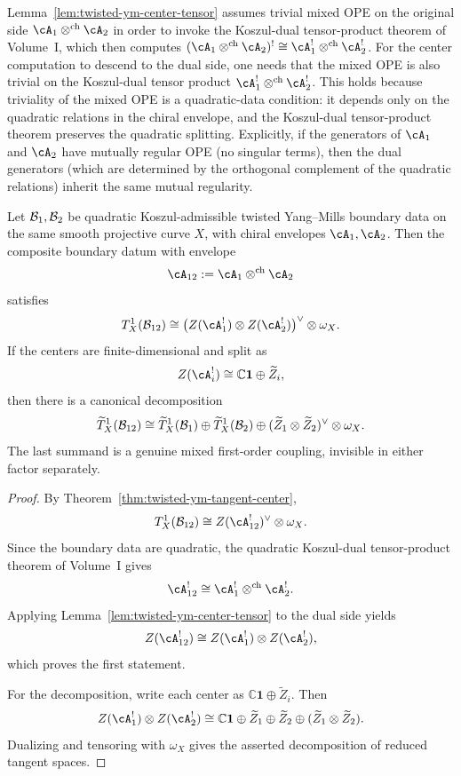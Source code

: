 \begin{remark}
\label{rem:mixed-ope-dual-side}
Lemma~\ref{lem:twisted-ym-center-tensor} assumes trivial mixed OPE on the original side $\cA_1\otimes^{\mathrm{ch}}\cA_2$ in order to invoke the Koszul-dual tensor-product theorem of Volume~I, which then computes $(\cA_1\otimes^{\mathrm{ch}}\cA_2)^! \cong \cA_1^!\otimes^{\mathrm{ch}}\cA_2^!$. For the center computation to descend to the dual side, one needs that the mixed OPE is also trivial on the Koszul-dual tensor product $\cA_1^!\otimes^{\mathrm{ch}}\cA_2^!$. This holds because triviality of the mixed OPE is a quadratic-data condition: it depends only on the quadratic relations in the chiral envelope, and the Koszul-dual tensor-product theorem preserves the quadratic splitting. Explicitly, if the generators of $\cA_1$ and $\cA_2$ have mutually regular OPE (no singular terms), then the dual generators (which are determined by the orthogonal complement of the quadratic relations) inherit the same mutual regularity.
\end{remark}

\begin{theorem}
\label{thm:twisted-ym-binary-mixed-couplings}
Let $\mathcal{B}_1,\mathcal{B}_2$ be quadratic Koszul-admissible twisted Yang--Mills boundary data on the same smooth projective curve $X$, with chiral envelopes $\cA_1,\cA_2$. Then the composite boundary datum with envelope
\[
\cA_{12}:=\cA_1\otimes^{\mathrm{ch}}\cA_2
\]
satisfies
\[
T^1_X(\cB_{12})
\cong
\bigl(Z(\cA_1^{!})\otimes Z(\cA_2^{!})\bigr)^{\vee}\otimes \omega_X.
\]
If the centers are finite-dimensional and split as
\[
Z(\cA_i^{!}) \cong \mathbb{C}\mathbf{1}\oplus \widetilde Z_i,
\]
then there is a canonical decomposition
\[
\widetilde T^1_X(\mathcal{B}_{12})
\cong
\widetilde T^1_X(\mathcal{B}_1)
\oplus
\widetilde T^1_X(\mathcal{B}_2)
\oplus
(\widetilde Z_1\otimes \widetilde Z_2)^{\vee}\otimes \omega_X.
\]
The last summand is a genuine mixed first-order coupling, invisible in either factor separately.
\end{theorem}

\begin{proof}
By Theorem~\ref{thm:twisted-ym-tangent-center},
\[
T^1_X(\cB_{12})
\cong
Z(\cA_{12}^{!})^{\vee}\otimes \omega_X.
\]
Since the boundary data are quadratic, the quadratic Koszul-dual
tensor-product theorem of Volume~I gives
\[
\cA_{12}^{!}
\cong
\cA_1^{!}\otimes^{\mathrm{ch}}\cA_2^{!}.
\]
Applying Lemma~\ref{lem:twisted-ym-center-tensor} to the dual side yields
\[
Z(\cA_{12}^{!})
\cong
Z(\cA_1^{!})\otimes Z(\cA_2^{!}),
\]
which proves the first statement.

For the decomposition, write each center as $\mathbb{C}\mathbf{1}\oplus \widetilde Z_i$. Then
\[
Z(\cA_1^{!})\otimes Z(\cA_2^{!})
\cong
\mathbb{C}\mathbf{1}
\oplus
\widetilde Z_1
\oplus
\widetilde Z_2
\oplus
(\widetilde Z_1\otimes \widetilde Z_2).
\]
Dualizing and tensoring with $\omega_X$ gives the asserted decomposition of reduced tangent spaces.
\end{proof}

